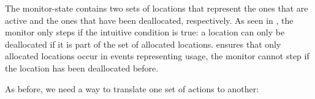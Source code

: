 \documentclass[a4paper,names,dvipsnames]{article}
\begin{document}

The monitor-state contains two sets of locations that represent the ones that are active and the ones that have been deallocated, respectively.
As seen in , the monitor only steps if the intuitive condition is true: a location can only be deallocated if it is part of the set of allocated locations.
 ensures that only allocated locations occur in events representing usage, the monitor cannot step if the location has been deallocated before.

As before, we need a way to translate one set of actions to another: 
\end{document}
